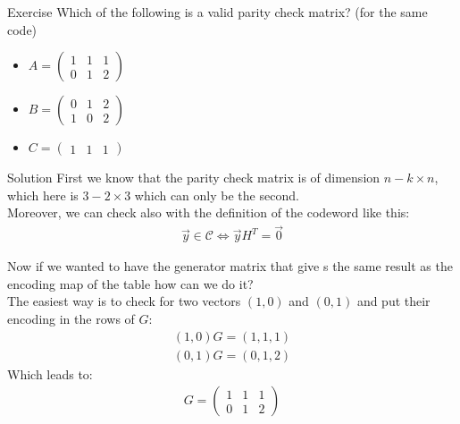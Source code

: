 \begin{parag}{Exercise}
    Which of the following is a valid parity check matrix? (for the same code)
    \begin{itemize}
        \item $A =  \begin{pmatrix} 1 & 1 & 1 \\ 0 & 1 & 2 \end{pmatrix} $
        \item $B =  \begin{pmatrix} 0 & 1 & 2 \\ 1 & 0 & 2 \end{pmatrix} $
        \item $C =  \begin{pmatrix} 1 & 1 & 1 \end{pmatrix} $
    \end{itemize}
\begin{subparag}{Solution}
    First we know that the parity check matrix is of dimension $n-k \times n$, which here is $3-2 \times 3$ which can only be the second.\\
    Moreover, we can check also with the definition of the codeword like this:
    \begin{align*} \vec{y} \in \mathcal{C} \iff \vec{y}H^T =  \vec{0} \end{align*}
\end{subparag}
Now if we wanted to have the generator matrix that give s the same result as the encoding map of the table how can we do it?\\
The easiest way is to check for two vectors $\left(1, 0\right)$ and $\left(0, 1\right)$ and put their encoding in the rows of  $G$:
\begin{align*} 
    \left(1, 0\right)G =  \left(1, 1, 1\right)\\
    \left(0, 1\right)G = \left(0, 1, 2\right)
\end{align*}
Which leads to:
\begin{align*} 
    G =  \begin{pmatrix} 1 & 1 & 1 \\ 0 & 1 & 2 \end{pmatrix} 
\end{align*}
\end{parag}
